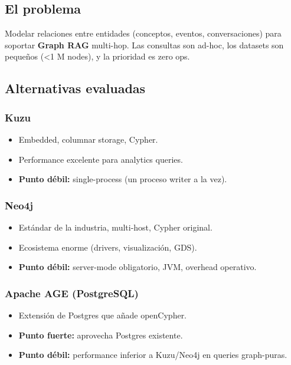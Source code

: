 \documentclass[11pt,a4paper]{article}
\begin{document}
\subsection{El problema}

Modelar relaciones entre entidades (conceptos, eventos, conversaciones) para soportar \textbf{Graph RAG} multi-hop. Las consultas son ad-hoc, los datasets son pequeños (\textless\hspace{0pt}1 M nodes), y la prioridad es zero ops.

\subsection{Alternativas evaluadas}

\subsubsection{Kuzu}
\begin{itemize}[leftmargin=*,itemsep=0pt]
\item Embedded, columnar storage, Cypher.
\item Performance excelente para analytics queries.
\item \textbf{Punto débil:} single-process (un proceso writer a la vez).
\end{itemize}

\subsubsection{Neo4j}
\begin{itemize}[leftmargin=*,itemsep=0pt]
\item Estándar de la industria, multi-host, Cypher original.
\item Ecosistema enorme (drivers, visualización, GDS).
\item \textbf{Punto débil:} server-mode obligatorio, JVM, overhead operativo.
\end{itemize}

\subsubsection{Apache AGE (PostgreSQL)}
\begin{itemize}[leftmargin=*,itemsep=0pt]
\item Extensión de Postgres que añade openCypher.
\item \textbf{Punto fuerte:} aprovecha Postgres existente.
\item \textbf{Punto débil:} performance inferior a Kuzu/Neo4j en queries graph-puras.
\end{itemize}
\end{document}
